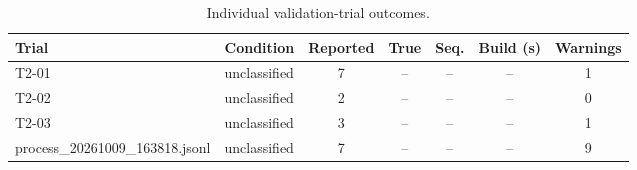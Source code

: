 \begin{table}[H]
\centering
\caption{Individual validation-trial outcomes.}
\label{tab:v21_trials}
\renewcommand{\arraystretch}{1.3}
\setlength{\tabcolsep}{5pt}
\footnotesize

\begin{tabular}{|l|l|c|c|c|c|c|}
\hline
\textbf{Trial} & \textbf{Condition} & \textbf{Reported} & \textbf{True} & \textbf{Seq.} & \textbf{Build (s)} & \textbf{Warnings} \\
\hline
T2-01 & unclassified & 7 & -- & -- & -- & 1 \\
\hline
T2-02 & unclassified & 2 & -- & -- & -- & 0 \\
\hline
T2-03 & unclassified & 3 & -- & -- & -- & 1 \\
\hline
process\_20261009\_163818.jsonl & unclassified & 7 & -- & -- & -- & 9 \\
\hline
\end{tabular}
\end{table}